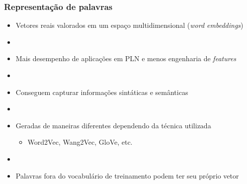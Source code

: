 \documentclass[10pt]{beamer}
\begin{document}
\begin{frame}[fragile]
  \frametitle{Representação de palavras}

  \begin{itemize}

    \item Vetores reais valorados em um espaço multidimensional (\textit{word embeddings})
    
    \item[\ ] \ 

    \item Mais desempenho de aplicações em PLN e menos engenharia de \textit{features}

    \item[\ ] \ 

    \item Conseguem capturar informações sintáticas e semânticas

    \item[\ ] \ 

    \item Geradas de maneiras diferentes dependendo da técnica utilizada
    \begin{itemize}
      \item[-] Word2Vec, Wang2Vec, GloVe, etc.
    \end{itemize}


    \item[\ ] \ 

    \item Palavras fora do vocabulário de treinamento podem ter seu próprio vetor


  \end{itemize}
  


\end{frame}
\end{document}
